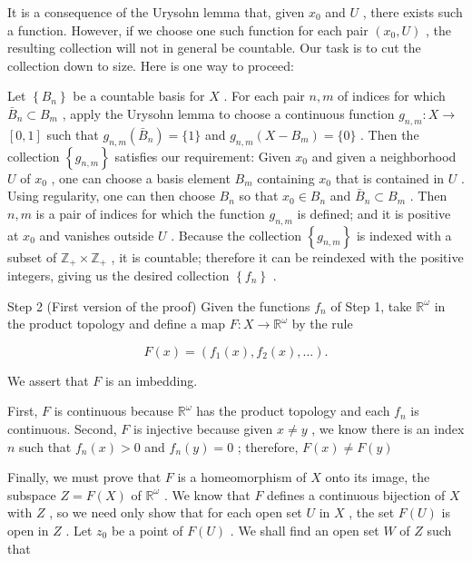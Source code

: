 It is a consequence of the Urysohn lemma that, given \({x}_{0}\) and \(U\) , there exists such a function. However, if we choose one such function for each pair \(\left( {{x}_{0},U}\right)\) , the resulting collection will not in general be countable. Our task is to cut the collection down to size. Here is one way to proceed:

Let \(\left\{  {B}_{n}\right\}\) be a countable basis for \(X\) . For each pair \(n,m\) of indices for which \({\bar{B}}_{n} \subset  {B}_{m}\) , apply the Urysohn lemma to choose a continuous function \({g}_{n,m} : X \rightarrow\)  \(\left\lbrack  {0,1}\right\rbrack\) such that \({g}_{n,m}\left( {\bar{B}}_{n}\right)  = \{ 1\}\) and \({g}_{n,m}\left( {X - {B}_{m}}\right)  = \{ 0\}\) . Then the collection \(\left\{  {g}_{n,m}\right\}\) satisfies our requirement: Given \({x}_{0}\) and given a neighborhood \(U\) of \({x}_{0}\) , one can choose a basis element \({B}_{m}\) containing \({x}_{0}\) that is contained in \(U\) . Using regularity, one can then choose \({B}_{n}\) so that \({x}_{0} \in  {B}_{n}\) and \({\bar{B}}_{n} \subset  {B}_{m}\) . Then \(n,m\) is a pair of indices for which the function \({g}_{n,m}\) is defined; and it is positive at \({x}_{0}\) and vanishes outside \(U\) . Because the collection \(\left\{  {g}_{n,m}\right\}\) is indexed with a subset of \({\mathbb{Z}}_{ + } \times  {\mathbb{Z}}_{ + }\) , it is countable; therefore it can be reindexed with the positive integers, giving us the desired collection \(\left\{  {f}_{n}\right\}\) .

Step 2 (First version of the proof) Given the functions \({f}_{n}\) of Step 1, take \({\mathbb{R}}^{\omega }\) in the product topology and define a map \(F : X \rightarrow  {\mathbb{R}}^{\omega }\) by the rule

\[
F\left( x\right)  = \left( {{f}_{1}\left( x\right) ,{f}_{2}\left( x\right) ,\ldots }\right) .
\]

We assert that \(F\) is an imbedding.

First, \(F\) is continuous because \({\mathbb{R}}^{\omega }\) has the product topology and each \({f}_{n}\) is continuous. Second, \(F\) is injective because given \(x \neq  y\) , we know there is an index \(n\) such that \({f}_{n}\left( x\right)  > 0\) and \({f}_{n}\left( y\right)  = 0\) ; therefore, \(F\left( x\right)  \neq  F\left( y\right)\)

Finally, we must prove that \(F\) is a homeomorphism of \(X\) onto its image, the subspace \(Z = F\left( X\right)\) of \({\mathbb{R}}^{\omega }\) . We know that \(F\) defines a continuous bijection of \(X\) with \(Z\) , so we need only show that for each open set \(U\) in \(X\) , the set \(F\left( U\right)\) is open in \(Z\) . Let \({z}_{0}\) be a point of \(F\left( U\right)\) . We shall find an open set \(W\) of \(Z\) such that

